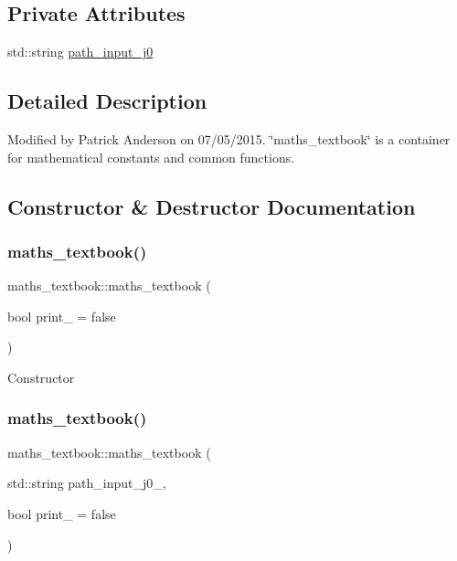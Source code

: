 \subsection*{Private Attributes}
\begin{DoxyCompactItemize}
\item 
std\+::string \hyperlink{classmaths__textbook_a5c8a254bd117beaba43916c38f8f6a66}{path\+\_\+input\+\_\+j0}
\end{DoxyCompactItemize}


\subsection{Detailed Description}
Modified by Patrick Anderson on 07/05/2015. \char`\"{}maths\+\_\+textbook\char`\"{} is a container for mathematical constants and common functions. 

\subsection{Constructor \& Destructor Documentation}
\mbox{\label{classmaths__textbook_a5a7c7fedbd125f32ce35deb6664a19d9}} 
\subsubsection{\texorpdfstring{maths\+\_\+textbook()}{maths\_textbook()}\hspace{0.1cm}{\footnotesize\ttfamily [1/2]}}
{\footnotesize\ttfamily maths\+\_\+textbook\+::maths\+\_\+textbook (\begin{DoxyParamCaption}\item[{bool}]{print\+\_\+ = {\ttfamily false} }\end{DoxyParamCaption})}

Constructor \mbox{\label{classmaths__textbook_a56743163bbb37c83a95d8cb1ca1cc35b}} 
\subsubsection{\texorpdfstring{maths\+\_\+textbook()}{maths\_textbook()}\hspace{0.1cm}{\footnotesize\ttfamily [2/2]}}
{\footnotesize\ttfamily maths\+\_\+textbook\+::maths\+\_\+textbook (\begin{DoxyParamCaption}\item[{std\+::string}]{path\+\_\+input\+\_\+j0\+\_\+,  }\item[{bool}]{print\+\_\+ = {\ttfamily false} }\end{DoxyParamCaption})}

